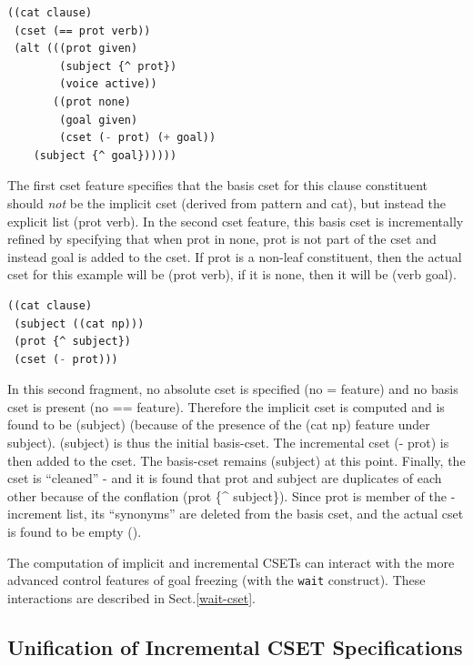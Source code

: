 \documentclass[10pt,a4paper]{report}
\begin{document}
\begin{lstlisting}[language=Lisp]
((cat clause)
 (cset (== prot verb))
 (alt (((prot given)
        (subject {^ prot})
        (voice active))
       ((prot none)
        (goal given)
        (cset (- prot) (+ goal))
	(subject {^ goal})))))
\end{lstlisting}

The first cset feature specifies that the basis cset for this clause
constituent should {\em not} be the implicit cset (derived from pattern and
cat), but instead the explicit list (prot verb).  In the second cset
feature, this basis cset is incrementally refined by specifying that when
prot in none, prot is not part of the cset and instead goal is added to the
cset.  If prot is a non-leaf constituent, then the actual cset for this
example will be (prot verb), if it is none, then it will be (verb goal).

\begin{lstlisting}[language=Lisp]
((cat clause)
 (subject ((cat np)))
 (prot {^ subject})
 (cset (- prot)))
\end{lstlisting}

In this second fragment, no absolute cset is specified (no = feature) and
no basis cset is present (no == feature).  Therefore the implicit cset is
computed and is found to be (subject) (because of the presence of the (cat
np) feature under subject).  (subject) is thus the initial basis-cset.  The
incremental cset (- prot) is then added to the cset.  The basis-cset
remains (subject) at this point.  Finally, the cset is ``cleaned'' - and it
is found that prot and subject are duplicates of each other because of the
conflation (prot \{\^{} subject\}).  Since prot is member of the -increment
list, its ``synonyms'' are deleted from the basis cset, and the actual cset
is found to be empty ().

The computation of implicit and incremental CSETs can interact with the
more advanced control features of goal freezing (with the {\tt wait}
construct).  These interactions are described in Sect.\ref{wait-cset}.


\subsection{Unification of Incremental CSET Specifications}
\end{document}
